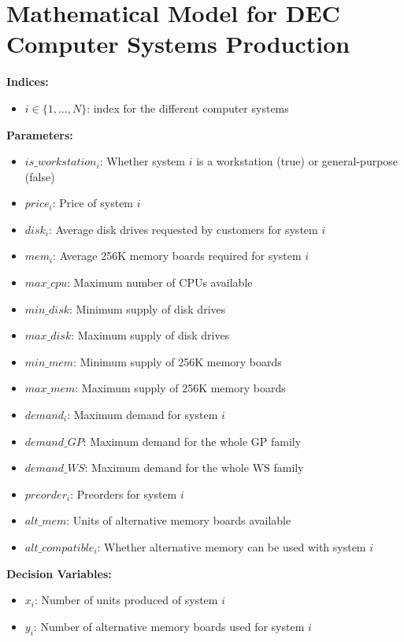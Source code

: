 \documentclass{article}
\begin{document}
\section*{Mathematical Model for DEC Computer Systems Production}

\textbf{Indices:}
\begin{itemize}
    \item $i \in \{1, \ldots, N\}$: index for the different computer systems
\end{itemize}

\textbf{Parameters:}
\begin{itemize}
    \item $is\_workstation_i$: Whether system $i$ is a workstation (true) or general-purpose (false)
    \item $price_i$: Price of system $i$
    \item $disk_i$: Average disk drives requested by customers for system $i$
    \item $mem_i$: Average 256K memory boards required for system $i$
    \item $max\_cpu$: Maximum number of CPUs available
    \item $min\_disk$: Minimum supply of disk drives
    \item $max\_disk$: Maximum supply of disk drives
    \item $min\_mem$: Minimum supply of 256K memory boards
    \item $max\_mem$: Maximum supply of 256K memory boards
    \item $demand_i$: Maximum demand for system $i$
    \item $demand\_GP$: Maximum demand for the whole GP family
    \item $demand\_WS$: Maximum demand for the whole WS family
    \item $preorder_i$: Preorders for system $i$
    \item $alt\_mem$: Units of alternative memory boards available
    \item $alt\_compatible_i$: Whether alternative memory can be used with system $i$
\end{itemize}

\textbf{Decision Variables:}
\begin{itemize}
    \item $x_i$: Number of units produced of system $i$
    \item $y_i$: Number of alternative memory boards used for system $i$
\end{itemize}
\end{document}
